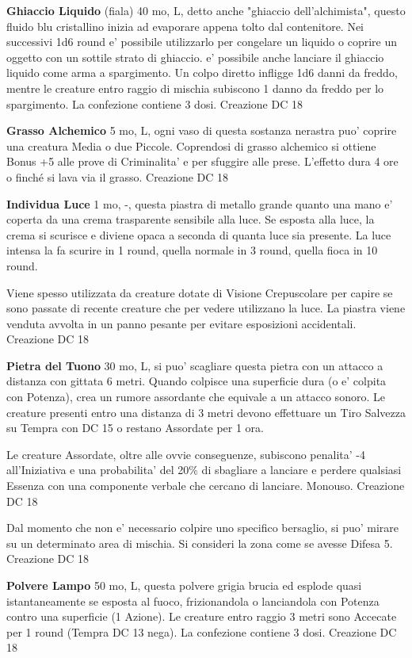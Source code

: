 \documentclass[a4paper,11pt,twoside,openany]{book}
\begin{document}
{		\textbf{Ghiaccio Liquido} (fiala) 40 mo, L, detto anche "ghiaccio dell'alchimista", questo fluido blu cristallino inizia ad evaporare appena tolto dal contenitore. Nei successivi 1d6 round e' possibile utilizzarlo per congelare un liquido o coprire un oggetto con un sottile strato di ghiaccio. e' possibile anche lanciare il ghiaccio liquido come arma a spargimento. Un colpo diretto infligge 1d6 danni da freddo, mentre le creature entro raggio di mischia subiscono 1 danno da freddo per lo spargimento. La confezione contiene 3 dosi. Creazione DC 18
		
		\textbf{Grasso Alchemico} 5 mo, L, ogni vaso di questa sostanza nerastra puo' coprire una creatura Media o due Piccole. Coprendosi di grasso alchemico si ottiene Bonus +5 alle prove di Criminalita' e per sfuggire alle prese. L'effetto dura 4 ore o finché si lava via il grasso. Creazione DC 18
		
		\textbf{Individua Luce} 1 mo, -, questa piastra di metallo grande quanto una mano e' coperta da una crema trasparente sensibile alla luce. Se esposta alla luce, la crema si scurisce e diviene opaca a seconda di quanta luce sia presente. La luce intensa la fa scurire in 1 round, quella normale in 3 round, quella fioca in 10 round. 
		
		Viene spesso utilizzata da creature dotate di Visione Crepuscolare per capire se sono passate di recente creature che per vedere utilizzano la luce. La piastra viene venduta avvolta in un panno pesante per evitare esposizioni accidentali. Creazione DC 18
		
		\textbf{Pietra del Tuono} 30 mo, L, si puo' scagliare questa pietra con un attacco a distanza con gittata 6 metri. Quando colpisce una superficie dura (o e' colpita con Potenza), crea un rumore assordante che equivale a un attacco sonoro. Le creature presenti entro una distanza di 3 metri devono effettuare un Tiro Salvezza su Tempra con DC 15 o restano Assordate per 1 ora. 
		
		Le creature Assordate, oltre alle ovvie conseguenze, subiscono penalita' -4 all'Iniziativa e una probabilita' del 20\% di sbagliare a lanciare e perdere qualsiasi Essenza con una componente verbale che cercano di lanciare. Monouso. Creazione DC 18
		
		Dal momento che non e' necessario colpire uno specifico bersaglio, si puo' mirare su un determinato area di mischia. Si consideri la zona come se avesse Difesa 5. Creazione DC 18
		
		\textbf{Polvere Lampo} 50 mo, L, questa polvere grigia brucia ed esplode quasi istantaneamente se esposta al fuoco, frizionandola o lanciandola con Potenza contro una superficie (1 Azione). Le creature entro raggio 3 metri sono Accecate per 1 round (Tempra DC 13 nega). La confezione contiene 3 dosi. Creazione DC 18
		
}
\end{document}

